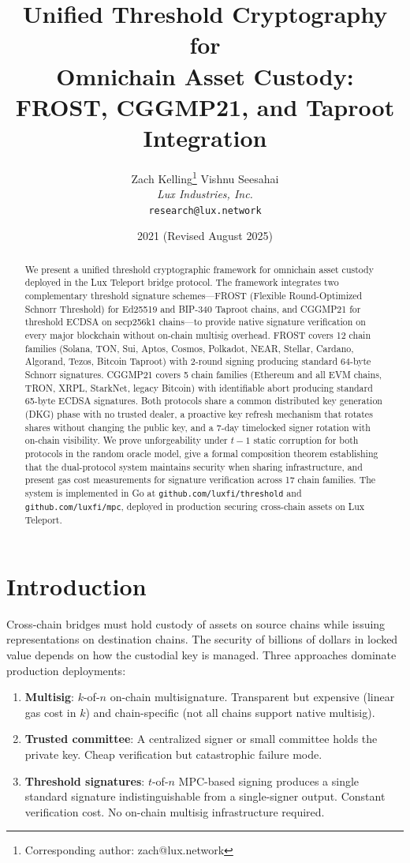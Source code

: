 \documentclass[11pt,twocolumn]{article}
\title{\textbf{Unified Threshold Cryptography for\\Omnichain Asset Custody:\\FROST, CGGMP21, and Taproot Integration}}
\author{
Zach Kelling\thanks{Corresponding author: zach@lux.network}
\quad
Vishnu Seesahai\\
\textit{Lux Industries, Inc.}\\
\texttt{research@lux.network}
}
\date{2021 (Revised August 2025)}
\begin{document}
\luxcoverpage

\begin{abstract}
We present a unified threshold cryptographic framework for omnichain asset custody
deployed in the Lux Teleport bridge protocol. The framework integrates two complementary
threshold signature schemes---FROST (Flexible Round-Optimized Schnorr Threshold) for
Ed25519 and BIP-340 Taproot chains, and CGGMP21 for threshold ECDSA on secp256k1
chains---to provide native signature verification on every major blockchain without
on-chain multisig overhead. FROST covers 12 chain families (Solana, TON, Sui, Aptos,
Cosmos, Polkadot, NEAR, Stellar, Cardano, Algorand, Tezos, Bitcoin Taproot) with
2-round signing producing standard 64-byte Schnorr signatures. CGGMP21 covers 5 chain
families (Ethereum and all EVM chains, TRON, XRPL, StarkNet, legacy Bitcoin) with
identifiable abort producing standard 65-byte ECDSA signatures. Both protocols share a
common distributed key generation (DKG) phase with no trusted dealer, a proactive key
refresh mechanism that rotates shares without changing the public key, and a 7-day
timelocked signer rotation with on-chain visibility. We prove unforgeability under
$t-1$ static corruption for both protocols in the random oracle model, give a formal
composition theorem establishing that the dual-protocol system maintains security when
sharing infrastructure, and present gas cost measurements for signature verification
across 17 chain families. The system is implemented in Go at
\texttt{github.com/luxfi/threshold} and \texttt{github.com/luxfi/mpc}, deployed in
production securing cross-chain assets on Lux Teleport.
\end{abstract}

\section{Introduction}
\label{sec:intro}

Cross-chain bridges must hold custody of assets on source chains while issuing
representations on destination chains. The security of billions of dollars in locked
value depends on how the custodial key is managed. Three approaches dominate
production deployments:

\begin{enumerate}[nosep]
  \item \textbf{Multisig}: $k$-of-$n$ on-chain multisignature. Transparent but
    expensive (linear gas cost in $k$) and chain-specific (not all chains support
    native multisig).
  \item \textbf{Trusted committee}: A centralized signer or small committee holds
    the private key. Cheap verification but catastrophic failure mode.
  \item \textbf{Threshold signatures}: $t$-of-$n$ MPC-based signing produces a
    single standard signature indistinguishable from a single-signer output.
    Constant verification cost. No on-chain multisig infrastructure required.
\end{enumerate}
\end{document}

